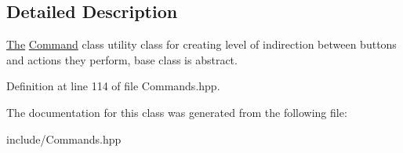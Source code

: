 \subsection{Detailed Description}
\hyperlink{namespace_the}{The} \hyperlink{class_command}{Command} class utility class for creating level of indirection between buttons and actions they perform, base class is abstract. 

Definition at line 114 of file Commands.\+hpp.



The documentation for this class was generated from the following file\+:\begin{DoxyCompactItemize}
\item 
include/Commands.\+hpp\end{DoxyCompactItemize}
